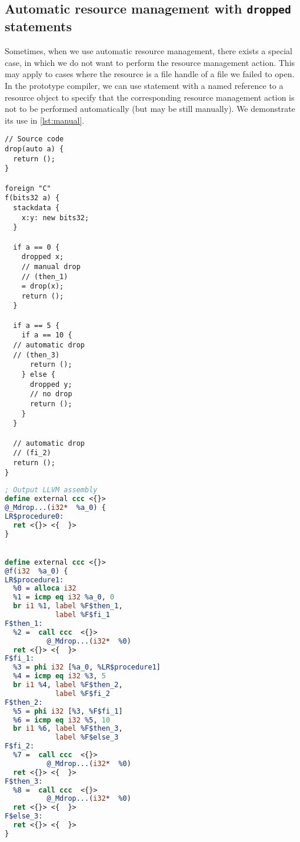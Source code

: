 \subsection{Automatic resource management with \texttt{dropped} statements}

Sometimes, when we use automatic resource management, there exists a special case, in which we do not want to perform the resource management action. This may apply to cases where the resource is a file handle of a file we failed to open. In the prototype compiler, we can use  statement with a named reference to a resource object to specify that the corresponding resource management action is not to be performed automatically (but may be still manually). We demonstrate its use in \cref{lst:manual}.


\begin{listing}
    \small
    \caption{Example use of automatic resource management with  statements (some names truncated for brevity)}
    \label{lst:manual}
    \begin{center}
    \begin{minipage}{0.35\linewidth}
    \begin{lstlisting}
// Source code
drop(auto a) {
  return ();
}

foreign "C"
f(bits32 a) {
  stackdata {
    x:y: new bits32;
  }

  if a == 0 {
    dropped x;
    // manual drop
    // (then_1)
    = drop(x);
    return ();
  }

  if a == 5 {
    if a == 10 {
  // automatic drop
  // (then_3)
      return ();
    } else {
      dropped y;
      // no drop
      return ();
    }
  }

  // automatic drop
  // (fi_2)
  return ();
}
    \end{lstlisting}
    \end{minipage}%
    \begin{minipage}{0.65\linewidth}
    \begin{lstlisting}[language=LLVM]
; Output LLVM assembly
define external ccc <{}>
@_Mdrop...(i32*  %a_0) {
LR$procedure0:
  ret <{}> <{  }>
}


define external ccc <{}>
@f(i32  %a_0) {
LR$procedure1:
  %0 = alloca i32
  %1 = icmp eq i32 %a_0, 0
  br i1 %1, label %F$then_1,
            label %F$fi_1
F$then_1:
  %2 =  call ccc  <{}>
          @_Mdrop...(i32*  %0)
  ret <{}> <{  }>
F$fi_1:
  %3 = phi i32 [%a_0, %LR$procedure1]
  %4 = icmp eq i32 %3, 5
  br i1 %4, label %F$then_2,
            label %F$fi_2
F$then_2:
  %5 = phi i32 [%3, %F$fi_1]
  %6 = icmp eq i32 %5, 10
  br i1 %6, label %F$then_3,
            label %F$else_3
F$fi_2:
  %7 =  call ccc  <{}>
          @_Mdrop...(i32*  %0)
  ret <{}> <{  }>
F$then_3:
  %8 =  call ccc  <{}>
          @_Mdrop...(i32*  %0)
  ret <{}> <{  }>
F$else_3:
  ret <{}> <{  }>
}
    \end{lstlisting}
    \end{minipage}
    \end{center}
\end{listing}

